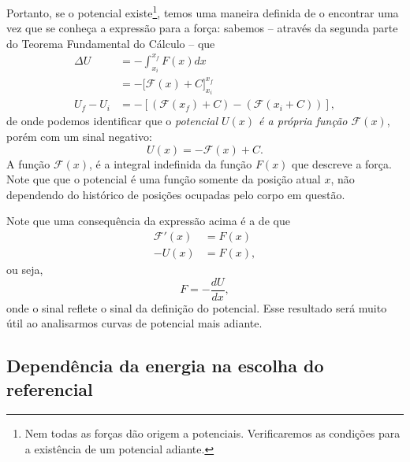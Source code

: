 Portanto, se o potencial existe\footnote{Nem todas as forças dão origem a potenciais. Verificaremos as condições para a existência de um potencial adiante.}, temos uma maneira definida de o encontrar uma vez que se conheça a expressão para a força: sabemos -- através da segunda parte do Teorema Fundamental do Cálculo -- que 
\begin{align}
    \Delta U &= - \int_{x_i}^{x_f} F(x) dx \\
    &= -\big[\mathcal{F}(x) + C\big]_{x_i}^{x_f} \\
    U_f - U_i &= -[(\mathcal{F}(x_f) + C) - (\mathcal{F}(x_i + C))],
\end{align}
%
de onde podemos identificar que o \emph{potencial $U(x)$ é a própria função $\mathcal{F}(x)$}, porém com um sinal negativo:
\begin{equation}\label{Eq:DefPotAntiderivada}
    U(x) = - \mathcal{F}(x) + C.
\end{equation}
%
A função $\mathcal{F}(x)$, é a integral indefinida da função $F(x)$ que descreve a força. Note que que o potencial é uma função somente da posição atual $x$, não dependendo do histórico de posições ocupadas pelo corpo em questão.

Note que uma consequência da expressão acima é a de que
\begin{align}
    \mathcal{F}'(x) &= F(x) \\
    -U(x) &= F(x),
\end{align}
%
ou seja,
\begin{equation}\label{Eq:ForcaGradPot}
  F =  -\frac{dU}{dx},
\end{equation}
%
onde o sinal reflete o sinal da definição do potencial. Esse resultado será muito útil ao analisarmos curvas de potencial mais adiante.

\subsection{Dependência da energia na escolha do referencial}


